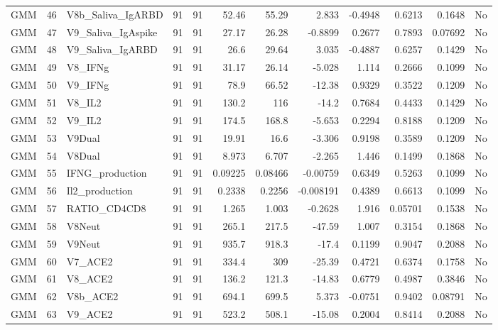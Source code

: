 \begin{longtable}{lrp{}rrrrrrrrl}
GMM & 46 & V8b\_Saliva\_IgARBD & 91 & 91 & 52.46 & 55.29 & 2.833 & -0.4948 & 0.6213 & 0.1648 & No \\
GMM & 47 & V9\_Saliva\_IgAspike & 91 & 91 & 27.17 & 26.28 & -0.8899 & 0.2677 & 0.7893 & 0.07692 & No \\
GMM & 48 & V9\_Saliva\_IgARBD & 91 & 91 & 26.6 & 29.64 & 3.035 & -0.4887 & 0.6257 & 0.1429 & No \\
GMM & 49 & V8\_IFNg & 91 & 91 & 31.17 & 26.14 & -5.028 & 1.114 & 0.2666 & 0.1099 & No \\
GMM & 50 & V9\_IFNg & 91 & 91 & 78.9 & 66.52 & -12.38 & 0.9329 & 0.3522 & 0.1209 & No \\
GMM & 51 & V8\_IL2 & 91 & 91 & 130.2 & 116 & -14.2 & 0.7684 & 0.4433 & 0.1429 & No \\
GMM & 52 & V9\_IL2 & 91 & 91 & 174.5 & 168.8 & -5.653 & 0.2294 & 0.8188 & 0.1209 & No \\
GMM & 53 & V9Dual & 91 & 91 & 19.91 & 16.6 & -3.306 & 0.9198 & 0.3589 & 0.1209 & No \\
GMM & 54 & V8Dual & 91 & 91 & 8.973 & 6.707 & -2.265 & 1.446 & 0.1499 & 0.1868 & No \\
GMM & 55 & IFNG\_production & 91 & 91 & 0.09225 & 0.08466 & -0.00759 & 0.6349 & 0.5263 & 0.1099 & No \\
GMM & 56 & Il2\_production & 91 & 91 & 0.2338 & 0.2256 & -0.008191 & 0.4389 & 0.6613 & 0.1099 & No \\
GMM & 57 & RATIO\_CD4CD8 & 91 & 91 & 1.265 & 1.003 & -0.2628 & 1.916 & 0.05701 & 0.1538 & No \\
GMM & 58 & V8Neut & 91 & 91 & 265.1 & 217.5 & -47.59 & 1.007 & 0.3154 & 0.1868 & No \\
GMM & 59 & V9Neut & 91 & 91 & 935.7 & 918.3 & -17.4 & 0.1199 & 0.9047 & 0.2088 & No \\
GMM & 60 & V7\_ACE2 & 91 & 91 & 334.4 & 309 & -25.39 & 0.4721 & 0.6374 & 0.1758 & No \\
GMM & 61 & V8\_ACE2 & 91 & 91 & 136.2 & 121.3 & -14.83 & 0.6779 & 0.4987 & 0.3846 & No \\
GMM & 62 & V8b\_ACE2 & 91 & 91 & 694.1 & 699.5 & 5.373 & -0.0751 & 0.9402 & 0.08791 & No \\
GMM & 63 & V9\_ACE2 & 91 & 91 & 523.2 & 508.1 & -15.08 & 0.2004 & 0.8414 & 0.2088 & No \\
\end{longtable}
